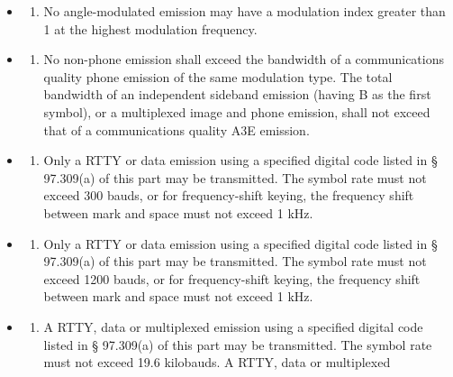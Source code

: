 \documentclass[
  letterpaper,
  DIV=11,
  numbers=noendperiod]{scrreport}
\providecommand{\tightlist}{%
  \setlength{\itemsep}{0pt}\setlength{\parskip}{0pt}}\usepackage{longtable,booktabs,array}
\begin{document}
\begin{itemize}
\item
  \begin{enumerate}
  \def\labelenumi{(\arabic{enumi})}
  \tightlist
  \item
    No angle-modulated emission may have a modulation index greater than
    1 at the highest modulation frequency.
  \end{enumerate}
\item
  \begin{enumerate}
  \def\labelenumi{(\arabic{enumi})}
  \setcounter{enumi}{1}
  \tightlist
  \item
    No non-phone emission shall exceed the bandwidth of a communications
    quality phone emission of the same modulation type. The total
    bandwidth of an independent sideband emission (having B as the first
    symbol), or a multiplexed image and phone emission, shall not exceed
    that of a communications quality A3E emission.
  \end{enumerate}
\item
  \begin{enumerate}
  \def\labelenumi{(\arabic{enumi})}
  \setcounter{enumi}{2}
  \tightlist
  \item
    Only a RTTY or data emission using a specified digital code listed
    in § 97.309(a) of this part may be transmitted. The symbol rate must
    not exceed 300 bauds, or for frequency-shift keying, the frequency
    shift between mark and space must not exceed 1 kHz.
  \end{enumerate}
\item
  \begin{enumerate}
  \def\labelenumi{(\arabic{enumi})}
  \setcounter{enumi}{3}
  \tightlist
  \item
    Only a RTTY or data emission using a specified digital code listed
    in § 97.309(a) of this part may be transmitted. The symbol rate must
    not exceed 1200 bauds, or for frequency-shift keying, the frequency
    shift between mark and space must not exceed 1 kHz.
  \end{enumerate}
\item
  \begin{enumerate}
  \def\labelenumi{(\arabic{enumi})}
  \setcounter{enumi}{4}
  \tightlist
  \item
    A RTTY, data or multiplexed emission using a specified digital code
    listed in § 97.309(a) of this part may be transmitted. The symbol
    rate must not exceed 19.6 kilobauds. A RTTY, data or multiplexed

\end{enumerate}
\end{itemize}
\end{document}

